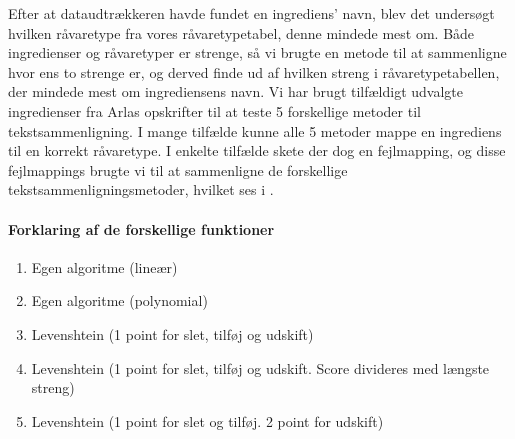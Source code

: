 Efter at dataudtrækkeren havde fundet en ingrediens' navn, blev det undersøgt hvilken råvaretype fra vores råvaretypetabel, denne mindede mest om. Både ingredienser og råvaretyper er strenge, så vi brugte en metode til at sammenligne hvor ens to strenge er, og derved finde ud af hvilken streng i råvaretypetabellen, der mindede mest om ingrediensens navn.
Vi har brugt tilfældigt udvalgte ingredienser fra Arlas opskrifter til at teste 5 forskellige metoder til tekstsammenligning. I mange tilfælde kunne alle 5 metoder mappe en ingrediens til en korrekt råvaretype. I enkelte tilfælde skete der dog en fejlmapping, og disse fejlmappings brugte vi til at sammenligne de forskellige tekstsammenligningsmetoder, hvilket ses i .

\paragraph{Forklaring af de forskellige  funktioner}
\begin{enumerate}
\item Egen algoritme (lineær)
\item Egen algoritme (polynomial)
\item Levenshtein (1 point for slet, tilføj og udskift)\cite{rubygemlevenshtein}
\item Levenshtein (1 point for slet, tilføj og udskift. Score divideres med længste streng)\cite{rubygemlevenshtein}
\item Levenshtein (1 point for slet og tilføj. 2 point for udskift)\cite{rubygemlevenshtein}
\end{enumerate}


